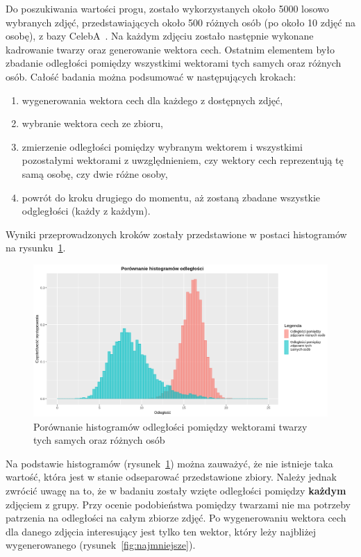 Do poszukiwania wartości progu, zostało wykorzystanych około \num{5000} losowo wybranych zdjęć,
przedstawiających około \num{500} różnych osób (po około \num{10} zdjęć na osobę),
z bazy CelebA~\cite{liu2015faceattributes}.
Na każdym zdjęciu zostało następnie wykonane kadrowanie twarzy oraz generowanie wektora cech.
Ostatnim elementem było zbadanie odległości pomiędzy wszystkimi wektorami tych samych oraz różnych osób.
Całość badania można podsumować w następujących krokach:
\begin{enumerate}
    \item wygenerowania wektora cech dla każdego z dostępnych zdjęć,
    \item wybranie wektora cech ze zbioru,
    \item zmierzenie odległości pomiędzy wybranym wektorem i wszystkimi pozostałymi wektorami z uwzględnieniem,
    czy wektory cech reprezentują tę samą osobę, czy dwie różne osoby,
    \item powrót do kroku drugiego do momentu, aż zostaną zbadane wszystkie odgległości (każdy z każdym).
\end{enumerate}
Wyniki przeprowadzonych kroków zostały przedstawione w postaci histogramów na rysunku~\ref{fig:porownanie_histogramow_odleglosci}.

\begin{figure}[H]
    \centering
    \includegraphics[width=1\textwidth]{./images/porownanie_histogramow_odleglosci}
    \caption{ Porównanie histogramów odległości pomiędzy wektorami twarzy tych samych oraz różnych osób }
    \customsource
    \label{fig:porownanie_histogramow_odleglosci}
\end{figure}

\pagebreak

Na podstawie histogramów (rysunek~\ref{fig:porownanie_histogramow_odleglosci}) można zauważyć,
że nie istnieje taka wartość, która jest w stanie odseparować przedstawione zbiory.
Należy jednak zwrócić uwagę na to, że w badaniu zostały wzięte odległości pomiędzy \textbf{każdym} zdjęciem z grupy.
Przy ocenie podobieństwa pomiędzy twarzami nie ma potrzeby patrzenia na odległości na całym zbiorze zdjęć.
Po wygenerowaniu wektora cech dla danego zdjęcia interesujący jest tylko ten wektor, który
leży najbliżej wygenerowanego (rysunek~\ref{fig:najmniejsze}).


